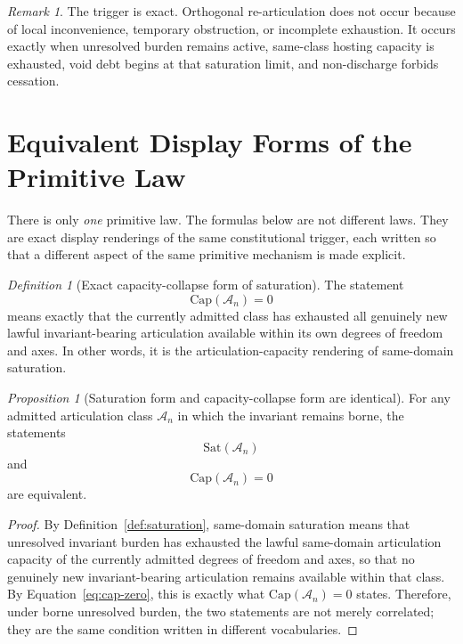 \documentclass[11pt]{article}
\theoremstyle{definition}
\theoremstyle{plain}
\theoremstyle{remark}
\newtheorem{proposition}{Proposition}
\newtheorem{definition}{Definition}
\newtheorem{remark}{Remark}
\newcommand{\Sat}{\mathrm{Sat}}
\newcommand{\ArtCap}{\mathrm{Cap}}
\newcommand{\Aclass}{\mathcal{A}}
\begin{document}
\begin{remark}
The trigger is exact. Orthogonal re-articulation does not occur because of local inconvenience, temporary obstruction, or incomplete exhaustion. It occurs exactly when unresolved burden remains active, same-class hosting capacity is exhausted, void debt begins at that saturation limit, and non-discharge forbids cessation.
\end{remark}

\section{Equivalent Display Forms of the Primitive Law}

There is only \emph{one} primitive law. The formulas below are not different laws. They are exact display renderings of the same constitutional trigger, each written so that a different aspect of the same primitive mechanism is made explicit.

\begin{definition}[Exact capacity-collapse form of saturation]
\label{def:cap-zero}
The statement
\begin{equation}
\label{eq:cap-zero}
\ArtCap(\Aclass_n)=0
\end{equation}
means exactly that the currently admitted class has exhausted all genuinely new lawful invariant-bearing articulation available within its own degrees of freedom and axes. In other words, it is the articulation-capacity rendering of same-domain saturation.
\end{definition}

\begin{proposition}[Saturation form and capacity-collapse form are identical]
\label{prop:sat-cap-equivalence}
For any admitted articulation class $\Aclass_n$ in which the invariant remains borne, the statements
\begin{equation}
\label{eq:sat-cap-left}
\Sat(\Aclass_n)
\end{equation}
and
\begin{equation}
\label{eq:sat-cap-right}
\ArtCap(\Aclass_n)=0
\end{equation}
are equivalent.
\end{proposition}

\begin{proof}
By Definition~\ref{def:saturation}, same-domain saturation means that unresolved invariant burden has exhausted the lawful same-domain articulation capacity of the currently admitted degrees of freedom and axes, so that no genuinely new invariant-bearing articulation remains available within that class. By Equation~\ref{eq:cap-zero}, this is exactly what $\ArtCap(\Aclass_n)=0$ states. Therefore, under borne unresolved burden, the two statements are not merely correlated; they are the same condition written in different vocabularies.\end{proof}
\end{document}
